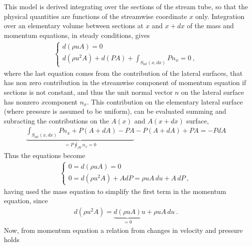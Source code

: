 \documentclass[letterpaper,10pt,english]{jupyterBook}
\begin{document}
\sphinxAtStartPar
This model is derived integrating over the sections of the stream tube, so that the physical quantities are functions of the streamwise coordinate \(x\) only. Integration over an elementary volume between sections at \(x\) and \(x+dx\) of the mass and momentum equations, in steady conditions, gives
\begin{equation*}
\begin{split}\begin{cases}
  d (\rho u A) = 0 \\
  d (\rho u^2 A) + d (P A) + \displaystyle\int_{S_{lat}(x,dx)} P n_x = 0 \ ,
\end{cases}\end{split}
\end{equation*}
\sphinxAtStartPar
where the last equation comes from the contribution of the lateral surfaces, that has non zero contribution in the streamwise component of momentum equation if sections is not constant, and thus the unit normal vector \(\hat{n}\) on the lateral surface has non\sphinxhyphen{}zero \(x\)\sphinxhyphen{}component \(n_x\). This contribution on the elementary lateral surface (where pressure is assumed to be uniform), can be evaluated summing and subracting the contributions on the \(A(x)\) and \(A(x+dx)\) surface,
\begin{equation*}
\begin{split}\underbrace{\displaystyle\int_{S_{lat}(x,dx)} P n_x + P (A+dA) - P A}_{ = P \oint_{\partial V} n_x = 0 } - P(A+dA) + PA =  - P dA \end{split}
\end{equation*}
\sphinxAtStartPar
Thus the equations become
\begin{equation*}
\begin{split}\begin{cases}
  0 = d (\rho u A) = 0 \\
  0 = d (\rho u^2 A) + A dP = \rho u A \, du + A \, dP \ ,
\end{cases}\end{split}
\end{equation*}
\sphinxAtStartPar
having used the mass equation to simplify the first term in the momentum equation, since
\begin{equation*}
\begin{split}d(\rho u^2 A) = \underbrace{d(\rho u A)}_{=0} u + \rho u A \, du \ .\end{split}
\end{equation*}
\sphinxAtStartPar
Now, from momentum equation a relation from changes in velocity and pressure holds
\end{document}
